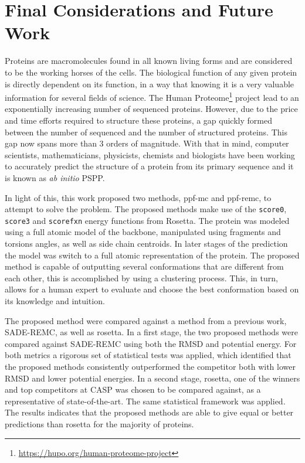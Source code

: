 \chapter{Final Considerations and Future Work}
\label{chap:final_considerations}

Proteins are macromolecules found in all known living forms and are
considered to be the working horses of the cells. The biological
function of any given protein is directly dependent on its
function, in a way that knowing it is a very valuable information
for several fields of science. The
Human Proteome\footnote{\url{https://hupo.org/human-proteome-project}} project
lead to an exponentially increasing number of sequenced proteins.
However, due to the price and time efforts required to structure
these proteins, a gap quickly formed between the number of sequenced
and the number of structured proteins. This gap now spans more than 3 orders
of magnitude. With that in mind, computer scientists, mathematicians,
physicists, chemists and biologists have been working to accurately
predict the structure of a protein from its primary
sequence and it is known as \textit{ab initio} PSPP.

In light of this, this work proposed two methods, ppf-mc and
ppf-remc, to attempt to solve the problem. The proposed methods make use of the \texttt{score0}, \texttt{score3} and \texttt{scorefxn} energy functions
from Rosetta. The protein was modeled using a full atomic model of the backbone,
manipulated using fragments and torsions angles, as well as side chain centroids.
In later stages of the prediction the model was switch to a full atomic
representation of the protein. The proposed method is capable of outputting
several conformations that are different from each other, this is accomplished
by using a clustering process. This, in turn, allows for a human expert to
evaluate and choose the best conformation based on its knowledge and intuition.

The proposed method were compared against a method from a previous work, SADE-REMC, as
well as rosetta. In a first stage, the two proposed methods were compared
against SADE-REMC using both the RMSD and potential energy.
For both metrics a rigorous set of statistical tests was applied, which identified that
the proposed methods consistently outperformed the competitor both with lower
RMSD and lower potential energies. In a second stage, rosetta, one of the
winners and top competitors at CASP was chosen to be compared against, as a
representative of state-of-the-art. The same statistical framework was applied.
The results indicates that the proposed methods are able to give equal or better
predictions than rosetta for the majority of proteins.

